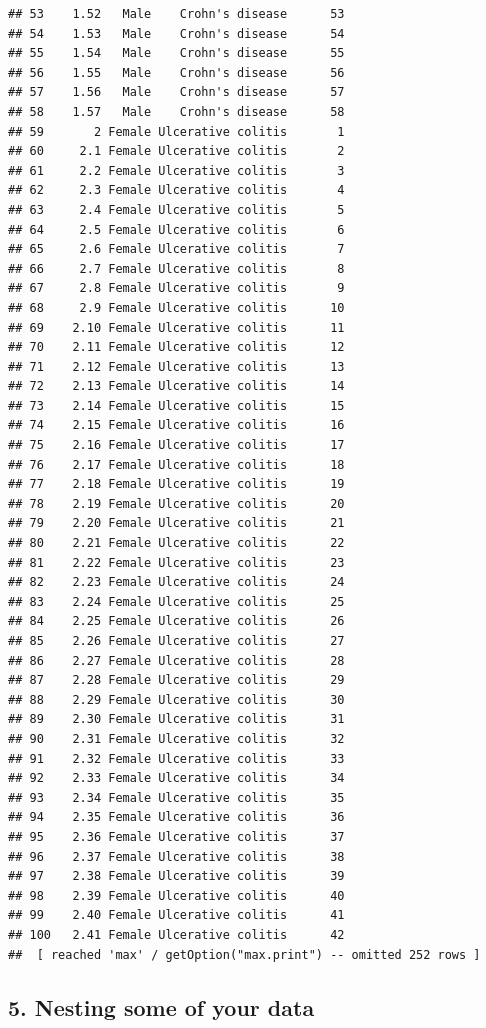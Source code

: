 \documentclass[
]{book}
\begin{document}
\begin{verbatim}
## 53    1.52   Male    Crohn's disease      53
## 54    1.53   Male    Crohn's disease      54
## 55    1.54   Male    Crohn's disease      55
## 56    1.55   Male    Crohn's disease      56
## 57    1.56   Male    Crohn's disease      57
## 58    1.57   Male    Crohn's disease      58
## 59       2 Female Ulcerative colitis       1
## 60     2.1 Female Ulcerative colitis       2
## 61     2.2 Female Ulcerative colitis       3
## 62     2.3 Female Ulcerative colitis       4
## 63     2.4 Female Ulcerative colitis       5
## 64     2.5 Female Ulcerative colitis       6
## 65     2.6 Female Ulcerative colitis       7
## 66     2.7 Female Ulcerative colitis       8
## 67     2.8 Female Ulcerative colitis       9
## 68     2.9 Female Ulcerative colitis      10
## 69    2.10 Female Ulcerative colitis      11
## 70    2.11 Female Ulcerative colitis      12
## 71    2.12 Female Ulcerative colitis      13
## 72    2.13 Female Ulcerative colitis      14
## 73    2.14 Female Ulcerative colitis      15
## 74    2.15 Female Ulcerative colitis      16
## 75    2.16 Female Ulcerative colitis      17
## 76    2.17 Female Ulcerative colitis      18
## 77    2.18 Female Ulcerative colitis      19
## 78    2.19 Female Ulcerative colitis      20
## 79    2.20 Female Ulcerative colitis      21
## 80    2.21 Female Ulcerative colitis      22
## 81    2.22 Female Ulcerative colitis      23
## 82    2.23 Female Ulcerative colitis      24
## 83    2.24 Female Ulcerative colitis      25
## 84    2.25 Female Ulcerative colitis      26
## 85    2.26 Female Ulcerative colitis      27
## 86    2.27 Female Ulcerative colitis      28
## 87    2.28 Female Ulcerative colitis      29
## 88    2.29 Female Ulcerative colitis      30
## 89    2.30 Female Ulcerative colitis      31
## 90    2.31 Female Ulcerative colitis      32
## 91    2.32 Female Ulcerative colitis      33
## 92    2.33 Female Ulcerative colitis      34
## 93    2.34 Female Ulcerative colitis      35
## 94    2.35 Female Ulcerative colitis      36
## 95    2.36 Female Ulcerative colitis      37
## 96    2.37 Female Ulcerative colitis      38
## 97    2.38 Female Ulcerative colitis      39
## 98    2.39 Female Ulcerative colitis      40
## 99    2.40 Female Ulcerative colitis      41
## 100   2.41 Female Ulcerative colitis      42
##  [ reached 'max' / getOption("max.print") -- omitted 252 rows ]
\end{verbatim}

\hypertarget{nesting-some-of-your-data}{%
\subsection{5. Nesting some of your data}\label{nesting-some-of-your-data}}
\end{document}
